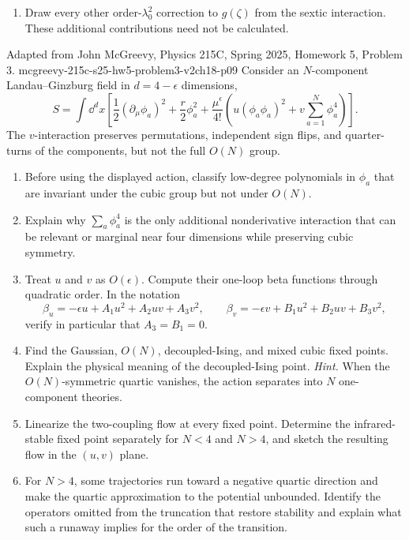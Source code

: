 \begin{enumerate}
\begin{enumerate}
\begin{enumerate}
      \item[(v)]
      Draw every other order-\(\lambda_0^2\) correction to \(g(\zeta)\)
      from the sextic interaction.  These additional contributions need
      not be calculated.
    \end{enumerate}
  \end{enumerate}

  {Adapted from John McGreevy, Physics 215C, Spring 2025,
  Homework 5, Problem 3.}
  {mcgreevy-215c-s25-hw5-problem3-v2ch18-p09}
  Consider an \(N\)-component Landau--Ginzburg field in
  \(d=4-\epsilon\) dimensions,
  \[
    S=\int \dd^dx\left[
      \frac12(\partial_\mu\phi_a)^2+\frac r2\phi_a^2
      +\frac{\mu^\epsilon}{4!}\left(
        u(\phi_a\phi_a)^2+v\sum_{a=1}^N\phi_a^4\right)\right].
  \]
  The \(v\)-interaction preserves permutations, independent sign flips,
  and quarter-turns of the components, but not the full \(O(N)\) group.
  \begin{enumerate}
    \item[(a)]
    Before using the displayed action, classify low-degree polynomials in
    \(\phi_a\) that are invariant under the cubic group but not under
    \(O(N)\).
    \item[(b)]
    Explain why \(\sum_a\phi_a^4\) is the only additional nonderivative
    interaction that can be relevant or marginal near four dimensions
    while preserving cubic symmetry.
    \item[(c)]
    Treat \(u\) and \(v\) as \(O(\epsilon)\).  Compute their one-loop beta
    functions through quadratic order.  In the notation
    \[
      \beta_u=-\epsilon u+A_1u^2+A_2uv+A_3v^2,\qquad
      \beta_v=-\epsilon v+B_1u^2+B_2uv+B_3v^2,
    \]
    verify in particular that \(A_3=B_1=0\).
    \item[(d)]
    Find the Gaussian, \(O(N)\), decoupled-Ising, and mixed cubic fixed
    points.  Explain the physical meaning of the decoupled-Ising point.
    \emph{Hint.}  When the \(O(N)\)-symmetric quartic vanishes, the action
    separates into \(N\) one-component theories.
    \item[(e)]
    Linearize the two-coupling flow at every fixed point.  Determine the
    infrared-stable fixed point separately for \(N<4\) and \(N>4\), and
    sketch the resulting flow in the \((u,v)\) plane.
    \item[(f)]
    For \(N>4\), some trajectories run toward a negative quartic direction
    and make the quartic approximation to the potential unbounded.
    Identify the operators omitted from the truncation that restore
    stability and explain what such a runaway implies for the order of the
    transition.
  \end{enumerate}


\end{enumerate}
